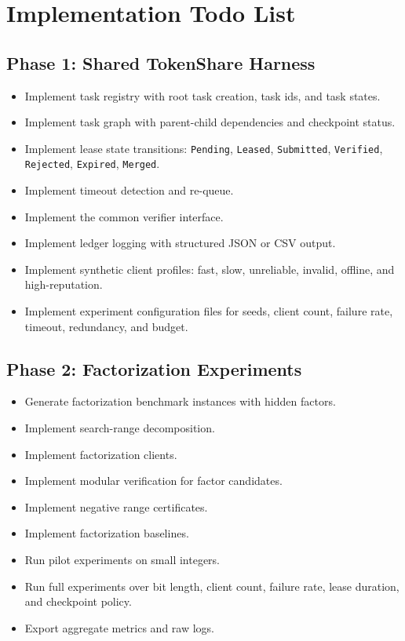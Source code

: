 \documentclass{article}
\theoremstyle{plain}
\begin{document}



\section{Implementation Todo List}

\subsection{Phase 1: Shared TokenShare Harness}

\begin{itemize}[leftmargin=*]
  \item Implement task registry with root task creation, task ids, and task states.
  \item Implement task graph with parent-child dependencies and checkpoint status.
  \item Implement lease state transitions: \texttt{Pending}, \texttt{Leased}, \texttt{Submitted}, \texttt{Verified}, \texttt{Rejected}, \texttt{Expired}, \texttt{Merged}.
  \item Implement timeout detection and re-queue.
  \item Implement the common verifier interface.
  \item Implement ledger logging with structured JSON or CSV output.
  \item Implement synthetic client profiles: fast, slow, unreliable, invalid, offline, and high-reputation.
  \item Implement experiment configuration files for seeds, client count, failure rate, timeout, redundancy, and budget.
\end{itemize}

\subsection{Phase 2: Factorization Experiments}

\begin{itemize}[leftmargin=*]
  \item Generate factorization benchmark instances with hidden factors.
  \item Implement search-range decomposition.
  \item Implement factorization clients.
  \item Implement modular verification for factor candidates.
  \item Implement negative range certificates.
  \item Implement factorization baselines.
  \item Run pilot experiments on small integers.
  \item Run full experiments over bit length, client count, failure rate, lease duration, and checkpoint policy.
  \item Export aggregate metrics and raw logs.
\end{itemize}
\end{document}
